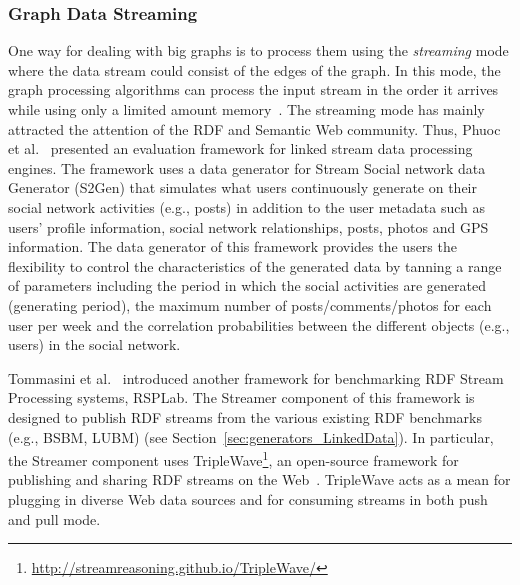 \subsubsection{Graph Data Streaming}
\label{sec:generators_streaming}
One way for dealing with big graphs is to process them using the \emph{streaming} mode where the data stream could consist of the edges of the graph. In this mode, the graph processing algorithms can process the input stream in the order it arrives while using only a limited amount memory~\cite{mcgregor2014graph}. The streaming mode has mainly  attracted the attention of the RDF and Semantic Web community. Thus, Phuoc et al.~\cite{le2012linked} presented an evaluation framework for linked stream data processing engines. The framework uses a data generator for Stream Social network data Generator (S2Gen) that simulates what users continuously generate on their social network activities (e.g., posts) in addition to the  user metadata such as users' profile information, social network relationships, posts, photos and GPS information. The data generator of this framework provides the users the flexibility to control the characteristics of the generated data by tanning a range of parameters including the period in which the social activities are generated (generating period), the maximum number of posts/comments/photos for each user per week and the correlation probabilities between the different objects (e.g., users) in the social network.

Tommasini et al.~\cite{tommasini2017rsplab} introduced another framework for benchmarking RDF Stream Processing systems, RSPLab. The Streamer component of this framework is designed to publish RDF streams from the various existing RDF benchmarks (e.g., BSBM, LUBM) (see Section~\ref{sec:generators_LinkedData}). In particular, the Streamer  component uses TripleWave\footnote{\url{http://streamreasoning.github.io/TripleWave/}}, an open-source framework for publishing and sharing RDF streams on the Web~\cite{mauri2016triplewave}.   TripleWave acts as a mean for plugging in diverse Web data sources and for consuming streams in both push and pull mode.
